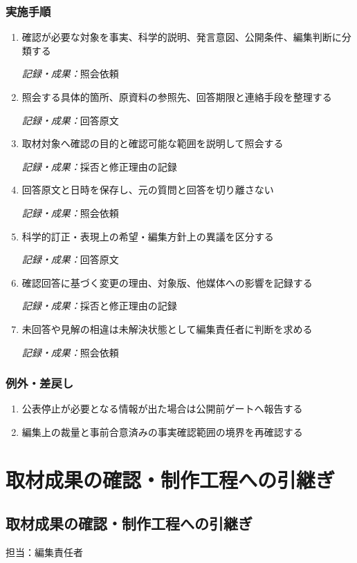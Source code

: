 \documentclass[a4paper,11pt]{article}
\begin{document}
\subsubsection*{実施手順}
\begin{enumerate}[leftmargin=2em,itemsep=0.65em]
\item 確認が必要な対象を事実、科学的説明、発言意図、公開条件、編集判断に分類する\par\noindent\textit{記録・成果：}照会依頼\nobreak\smallskip
\item 照会する具体的箇所、原資料の参照先、回答期限と連絡手段を整理する\par\noindent\textit{記録・成果：}回答原文\nobreak\smallskip
\item 取材対象へ確認の目的と確認可能な範囲を説明して照会する\par\noindent\textit{記録・成果：}採否と修正理由の記録\nobreak\smallskip
\item 回答原文と日時を保存し、元の質問と回答を切り離さない\par\noindent\textit{記録・成果：}照会依頼\nobreak\smallskip
\item 科学的訂正・表現上の希望・編集方針上の異議を区分する\par\noindent\textit{記録・成果：}回答原文\nobreak\smallskip
\item 確認回答に基づく変更の理由、対象版、他媒体への影響を記録する\par\noindent\textit{記録・成果：}採否と修正理由の記録\nobreak\smallskip
\item 未回答や見解の相違は未解決状態として編集責任者に判断を求める\par\noindent\textit{記録・成果：}照会依頼\nobreak\smallskip
\end{enumerate}
\subsubsection*{例外・差戻し}
\begin{enumerate}[leftmargin=2em,itemsep=0.35em]
\item 公表停止が必要となる情報が出た場合は公開前ゲートへ報告する
\item 編集上の裁量と事前合意済みの事実確認範囲の境界を再確認する
\end{enumerate}
\section{取材成果の確認・制作工程への引継ぎ}
\subsection{取材成果の確認・制作工程への引継ぎ}
\par 担当：編集責任者\par\medskip
\end{document}
